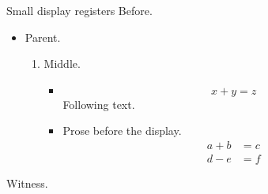 \documentclass[11pt]{beamer}
\begin{document}
\begin{frame}[t]{Small display registers}
Before.\par
\begin{itemize}\item Parent.
\begin{enumerate}\item Middle.
\begin{itemize}\item \[x+y=z\] Following text.
\item Prose before the display.\[\begin{aligned}a+b&=c\\d-e&=f\end{aligned}\]
\end{itemize}\end{enumerate}\end{itemize}
Witness.\par
\end{frame}
\end{document}
